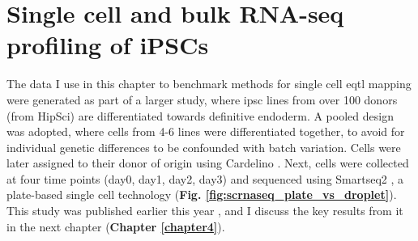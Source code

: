 
\section{Single cell and bulk RNA-seq profiling of iPSCs}

The data I use in this chapter to benchmark methods for single cell \gls{eqtl} mapping 
were generated as part of a larger study, where \gls{ipsc} lines from over 100 donors (from HipSci) are differentiated towards definitive endoderm.
A pooled design was adopted, where cells from 4-6 lines were differentiated together, to avoid for individual genetic differences to be confounded with batch variation. 
Cells were later assigned to their donor of origin using Cardelino \cite{mccarthy2020cardelino}. 
Next, cells were collected at four time points (day0, day1, day2, day3) and sequenced using Smartseq2 \cite{picelli2013smart}, a plate-based single cell technology (\textbf{Fig. \ref{fig:scrnaseq_plate_vs_droplet}}).
This study was published earlier this year \cite{cuomo2020single}, and I discuss the key results from it in the next chapter (\textbf{Chapter 
\ref{chapter4}}).
\\

